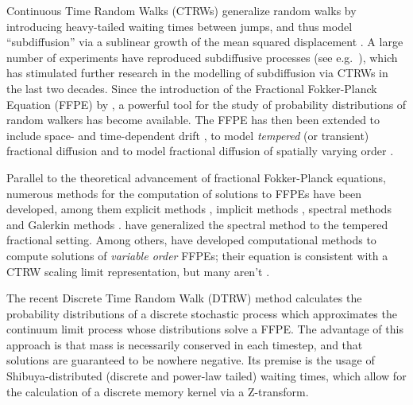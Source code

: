 \documentclass[a4paper,12pt]{elsarticle}
\numberwithin{equation}{section}
\theoremstyle{plain}
\theoremstyle{definition}
\theoremstyle{remark}
\numberwithin{equation}{section}
\newcommand{\1}{\mathbf 1}
\begin{document}
Continuous Time Random Walks (CTRWs) \citep{Scher1975} generalize random walks by introducing heavy-tailed waiting times between jumps, and thus model ``subdiffusion'' via a sublinear growth of the mean squared displacement \citep{HLS2010b}.
A large number of experiments have reproduced subdiffusive processes (see e.g.\ \cite{Metzler2000,TMT04,Wong04,Banks2005,Santamaria2006a,
Berkowitz2008,Hofling2012,Regner2013}), which has stimulated further research in the modelling of subdiffusion via CTRWs in the last two decades. Since the introduction of the Fractional Fokker-Planck Equation (FFPE) by \cite{BMK00}, a powerful tool for the study of probability distributions of random walkers has become available.
The FFPE has then been extended to include space- and time-dependent drift \citep{HLS10PRL},
to model \emph{tempered} (or transient) fractional diffusion \citep{Gajda2010,StrakaThesis,Zhang2015,Sabzikar2015}
and to model fractional diffusion of spatially varying order
\citep{Chechkin2005a, Straka17}.


Parallel to the theoretical advancement of fractional Fokker-Planck equations, numerous methods for the computation of solutions to FFPEs have been developed, among them explicit methods \citep{Yuste2005}, implicit methods \citep{Langlands2005a}, spectral methods \citep{Li2009} and Galerkin methods \citep{Mustapha2011}.
\cite{Hanert2014} have generalized the spectral method to the tempered fractional setting.
Among others, \cite{Chen2010} have developed computational methods to compute solutions of \emph{variable order} FFPEs; their equation is consistent with a CTRW scaling limit representation, but many aren't \citep{Straka17}.

The recent Discrete Time Random Walk (DTRW) method \citep{Angstmann2015a,Angstmann2016a} calculates the probability distributions of a discrete stochastic process which approximates the continuum limit process whose distributions solve a FFPE. The advantage of this approach is that mass is necessarily conserved in each timestep, and that solutions are guaranteed to be nowhere negative.  Its premise is the usage of Shibuya-distributed (discrete and power-law tailed) waiting times, which allow for the calculation of a discrete memory kernel via a Z-transform.
\end{document}
